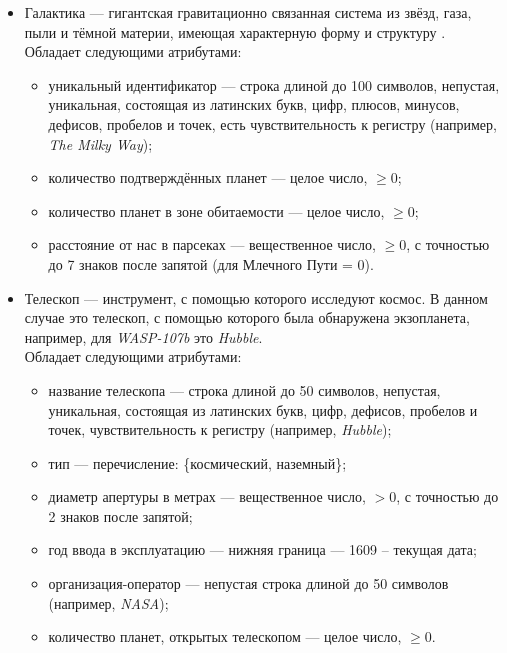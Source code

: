 \documentclass[14pt,a4paper]{extarticle}
\begin{document}
\begin{itemize}
		
		
		
		\item Галактика --- гигантская гравитационно связанная система из звёзд, газа, пыли и тёмной материи, имеющая характерную форму и структуру \cite{largeScale}.\\
		Обладает следующими атрибутами:
		\begin{itemize}
			\item уникальный идентификатор --- строка длиной до 100 символов, непустая, уникальная, состоящая из латинских букв, цифр, плюсов, минусов, дефисов, пробелов и точек, есть чувствительность к регистру (например, \textit{The Milky Way});
			\item количество подтверждённых планет --- целое число, $\geq 0$;
			\item количество планет в зоне обитаемости --- целое число, $\geq 0$;
			\item расстояние от нас в парсеках --- вещественное число, $\geq 0$, с точностью до 7 знаков после запятой (для Млечного Пути = 0).
		\end{itemize}
		
		\item Телескоп --- инструмент, с помощью которого исследуют космос. В данном случае это телескоп, с помощью которого была обнаружена экзопланета, например, для \textit{WASP-107b} это \textit{Hubble}.\\
		Обладает следующими атрибутами:
		\begin{itemize}
			\item название телескопа --- строка длиной до 50 символов, непустая, уникальная, состоящая из латинских букв, цифр, дефисов, пробелов и точек, чувствительность к регистру (например, \textit{Hubble});
			\item тип --- перечисление: \{космический, наземный\};
			\item диаметр апертуры в метрах --- вещественное число, $> 0$, с точностью до 2 знаков после запятой;
			\item год ввода в эксплуатацию --- нижняя граница --- 1609 -- текущая дата;
			\item организация-оператор --- непустая строка длиной до 50 символов (например, \textit{NASA});
			\item количество планет, открытых телескопом --- целое число, $\geq 0$.
		\end{itemize}
		

\end{itemize}
\end{document}
